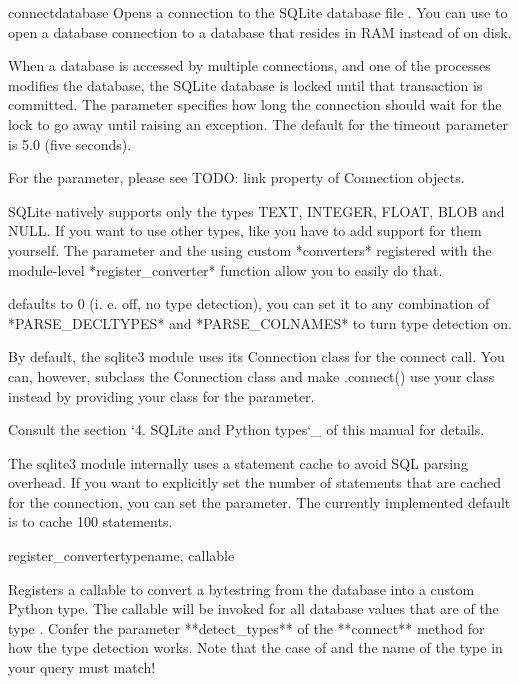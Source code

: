 \begin{funcdesc}{connect}{database}
Opens a connection to the SQLite database file . You can use
 to open a database connection to a database that resides in
RAM instead of on disk.

When a database is accessed by multiple connections, and one of the processes
modifies the database, the SQLite database is locked until that transaction is
committed. The  parameter specifies how long the connection should
wait for the lock to go away until raising an exception. The default for the
timeout parameter is 5.0 (five seconds). 

For the  parameter, please see TODO: link property of
Connection objects.

SQLite natively supports only the types TEXT, INTEGER, FLOAT, BLOB and NULL. If
you want to use other types, like you have to add support for them yourself.
The  parameter and the using custom *converters* registered with
the module-level *register_converter* function allow you to easily do that.

 defaults to 0 (i. e. off, no type detection), you can set it
to any combination of *PARSE_DECLTYPES* and *PARSE_COLNAMES* to turn type
detection on.

By default, the sqlite3 module uses its Connection class for the connect call.
You can, however, subclass the Connection class and make .connect() use your
class instead by providing your class for the  parameter.

Consult the section `4. SQLite and Python types`_ of this manual for details.

The sqlite3 module internally uses a statement cache to avoid SQL parsing
overhead. If you want to explicitly set the number of statements that are
cached for the connection, you can set the  parameter.
The currently implemented default is to cache 100 statements.
\end{funcdesc}

\begin{funcdesc}{register_converter}{typename, callable}

Registers a callable to convert a bytestring from the database into a custom
Python type. The callable will be invoked for all database values that are of
the type . Confer the parameter **detect_types** of the
**connect** method for how the type detection works. Note that the case of
 and the name of the type in your query must match!
\end{funcdesc}

